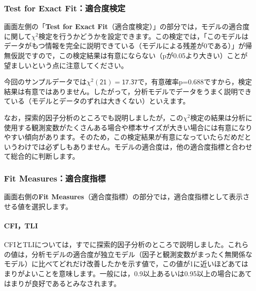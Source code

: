 \documentclass[
  12pt,
  a5jpaper,
  lualatex, ja=standard]{bxjsbook}
\begin{document}
\hypertarget{test-for-exact-fitux9069ux5408ux5ea6ux691cux5b9a}{%
\subsubsection*{Test for Exact Fit：適合度検定}\label{test-for-exact-fitux9069ux5408ux5ea6ux691cux5b9a}}

画面左側の「\textbf{Test for Exact Fit}（適合度検定）」の部分では，モデルの適合度に関して\(\chi^2\)検定を行うかどうかを設定できます。この検定では，「このモデルはデータがもつ情報を完全に説明できている（モデルによる残差が0である）」が帰無仮説ですので，この検定結果は有意にならない（pが0.05より大きい）ことが望ましいという点に注意してください。

今回のサンプルデータでは\(\chi^2(\textsf{21})=\textsf{17.37}\)で，有意確率p=0.688ですから，検定結果は有意ではありません。したがって，分析モデルでデータをうまく説明できている（モデルとデータのずれは大きくない）といえます。

なお，探索的因子分析のところでも説明しましたが，この\(\chi^2\)検定の結果は分析に使用する観測変数がたくさんある場合や標本サイズが大きい場合には有意になりやすい傾向があります。そのため，この検定結果が有意になっていたらだめだというわけでは必ずしもありません。モデルの適合度は，他の適合度指標と合わせて総合的に判断します。

\hypertarget{fit-measuresux9069ux5408ux5ea6ux6307ux6a19-2}{%
\subsubsection*{Fit Measures：適合度指標}\label{fit-measuresux9069ux5408ux5ea6ux6307ux6a19-2}}

画面右側の\textbf{Fit Measures}（適合度指標）の部分では，適合度指標として表示させる値を選択します。

\hypertarget{cfitli}{%
\paragraph*{CFI，TLI}\label{cfitli}}

CFIとTLIについては，すでに探索的因子分析のところで説明しました。これらの値は，分析モデルの適合度が独立モデル（因子と観測変数がまったく無関係なモデル）に比べてどれだけ改善したかを示す値で，この値が1に近いほどあてはまりがよいことを意味します。一般には，0.9以上あるいは0.95以上の場合にあてはまりが良好であるとみなされます。
\end{document}
